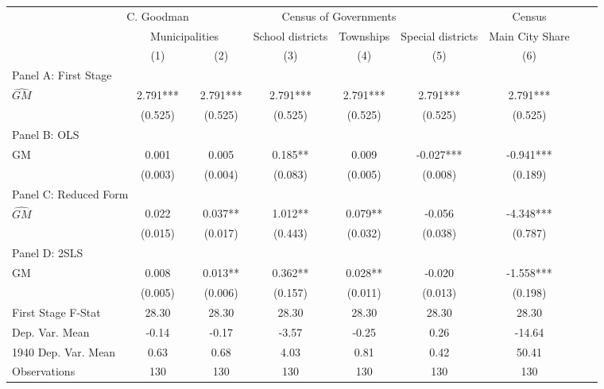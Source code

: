  \begin{tabular}{l*{8}{c}} \toprule
&\multicolumn{1}{c}{C. Goodman}&\multicolumn{4}{c}{Census of Governments}&\multicolumn{1}{c}{Census}\\\cmidrule(lr){2-2}\cmidrule(lr){3-6}\cmidrule(lr){7-7}
&\multicolumn{2}{c}{Municipalities}&\multicolumn{1}{c}{School districts}&\multicolumn{1}{c}{Townships}&\multicolumn{1}{c}{Special districts}&\multicolumn{1}{c}{Main City Share}\\\cmidrule(lr){2-3}\cmidrule(lr){4-6}\cmidrule(lr){7-7}
&\multicolumn{1}{c}{(1)}&\multicolumn{1}{c}{(2)}&\multicolumn{1}{c}{(3)}&\multicolumn{1}{c}{(4)}&\multicolumn{1}{c}{(5)}&\multicolumn{1}{c}{(6)}\\
\cmidrule(lr){1-7}
\multicolumn{6}{l}{Panel A: First Stage}\\
\cmidrule(lr){1-7}
$\widehat{GM}$  &    2.791***&    2.791***&    2.791***&    2.791***&    2.791***&    2.791***\\
                &  (0.525)   &  (0.525)   &  (0.525)   &  (0.525)   &  (0.525)   &  (0.525)   \\
\cmidrule(lr){1-7}
\multicolumn{6}{l}{Panel B: OLS}\\
\cmidrule(lr){1-7}
GM              &    0.001   &    0.005   &    0.185** &    0.009   &   -0.027***&   -0.941***\\
                &  (0.003)   &  (0.004)   &  (0.083)   &  (0.005)   &  (0.008)   &  (0.189)   \\
\cmidrule(lr){1-7}
\multicolumn{6}{l}{Panel C: Reduced Form}\\
\cmidrule(lr){1-7}
$\widehat{GM}$  &    0.022   &    0.037** &    1.012** &    0.079** &   -0.056   &   -4.348***\\
                &  (0.015)   &  (0.017)   &  (0.443)   &  (0.032)   &  (0.038)   &  (0.787)   \\
\cmidrule(lr){1-7}
\multicolumn{6}{l}{Panel D: 2SLS}\\
\cmidrule(lr){1-7}
GM              &    0.008   &    0.013** &    0.362** &    0.028** &   -0.020   &   -1.558***\\
                &  (0.005)   &  (0.006)   &  (0.157)   &  (0.011)   &  (0.013)   &  (0.198)   \\
\midrule
First Stage F-Stat&    28.30   &    28.30   &    28.30   &    28.30   &    28.30   &    28.30   \\
Dep. Var. Mean  &    -0.14   &    -0.17   &    -3.57   &    -0.25   &     0.26   &   -14.64   \\
1940 Dep. Var. Mean&     0.63   &     0.68   &     4.03   &     0.81   &     0.42   &    50.41   \\
Observations    &      130   &      130   &      130   &      130   &      130   &      130   \\
       \bottomrule \end{tabular}
